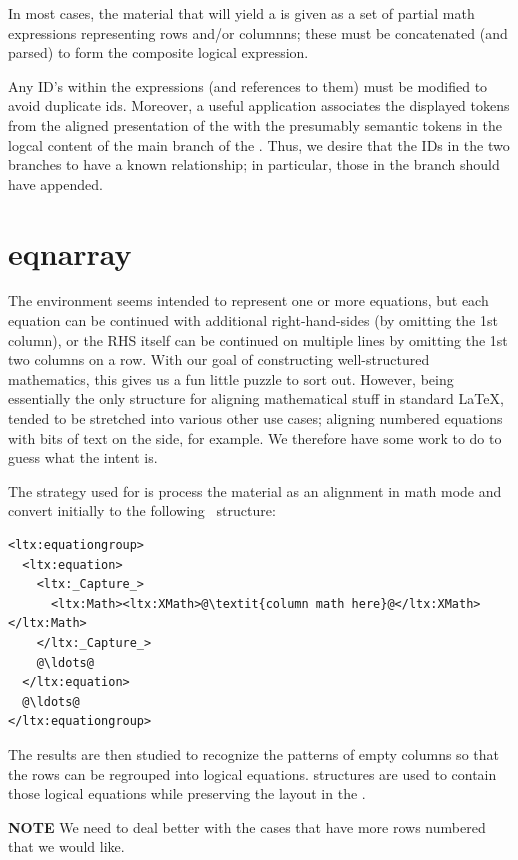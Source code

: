 \documentclass{book}
\begin{document}
In most cases, the material that will yield a 
is given as a set of partial math expressions representing rows and/or columnns;
these must be concatenated (and parsed) to form the composite logical expression.

Any ID's within the expressions (and references to them) must be modified
to avoid duplicate ids.  Moreover, a useful application associates the
displayed tokens from the aligned presentation of the 
with the presumably semantic tokens in the logcal content of the main branch
of the .  Thus, we desire that the IDs in the two
branches to have a known relationship; in particular, those in the branch
should have  appended.


\section{eqnarray}\label{alignments.eqnarray}
The  environment seems intended to represent one or more
equations, but each equation can be continued with additional right-hand-sides
(by omitting the 1st column), or the RHS itself can be continued on multiple
lines by omitting the 1st two columns on a row.
With our goal of constructing well-structured mathematics, this gives us
a fun little puzzle to sort out. 
However, being essentially the only structure for aligning mathematical
stuff in standard \LaTeX,  tended to be stretched
into various other use cases; aligning numbered equations with bits of text on the side,
for example.  We therefore have some work to do to guess what the intent is.

The strategy used for  is process the material as
an alignment in math mode and convert initially to the following \XML\ structure:
\begin{lstlisting}[style=xml]
<ltx:equationgroup>
  <ltx:equation>
    <ltx:_Capture_>
      <ltx:Math><ltx:XMath>@\textit{column math here}@</ltx:XMath></ltx:Math>
    </ltx:_Capture_>
    @\ldots@
  </ltx:equation>
  @\ldots@
</ltx:equationgroup>
\end{lstlisting}
The results are then studied to recognize the patterns of empty columns
so that the rows can be regrouped into logical equations.  
structures are used to contain those logical equations while preserving
the layout in the .

\textbf{NOTE} We need to deal better with the cases that have more
rows numbered that we would like.
\end{document}
